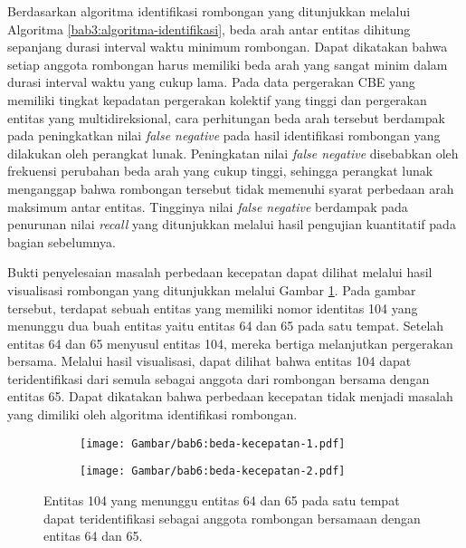 Berdasarkan algoritma identifikasi rombongan yang ditunjukkan melalui Algoritma \ref{bab3:algoritma-identifikasi}, beda arah antar entitas dihitung sepanjang durasi interval waktu minimum rombongan. Dapat dikatakan bahwa setiap anggota rombongan harus memiliki beda arah yang sangat minim dalam durasi interval waktu yang cukup lama. Pada data pergerakan CBE yang memiliki tingkat kepadatan pergerakan kolektif yang tinggi dan pergerakan entitas yang multidireksional, cara perhitungan beda arah tersebut berdampak pada peningkatkan nilai \textit{false negative} pada hasil identifikasi rombongan yang dilakukan oleh perangkat lunak. Peningkatan nilai \textit{false negative} disebabkan oleh frekuensi perubahan beda arah yang cukup tinggi, sehingga perangkat lunak menganggap bahwa rombongan tersebut tidak memenuhi syarat perbedaan arah maksimum antar entitas. Tingginya nilai \textit{false negative} berdampak pada penurunan nilai \textit{recall} yang ditunjukkan melalui hasil pengujian kuantitatif pada bagian sebelumnya.

Bukti penyelesaian masalah perbedaan kecepatan dapat dilihat melalui hasil visualisasi rombongan yang ditunjukkan melalui Gambar \ref{bab6:solusi-beda-kecepatan}. Pada gambar tersebut, terdapat sebuah entitas yang memiliki nomor identitas 104 yang menunggu dua buah entitas yaitu entitas 64 dan 65 pada satu tempat. Setelah entitas 64 dan 65 menyusul entitas 104, mereka bertiga melanjutkan pergerakan bersama. Melalui hasil visualisasi, dapat dilihat bahwa entitas 104 dapat teridentifikasi dari semula sebagai anggota dari rombongan bersama dengan entitas 65. Dapat dikatakan bahwa perbedaan kecepatan tidak menjadi masalah yang dimiliki oleh algoritma identifikasi rombongan.

\begin{figure}[t]
    \centering
    \captionsetup{width=.85\textwidth}
    \begin{subfigure}[t]{0.45\textwidth}
        \centering
        \texttt{[image: Gambar/bab6:beda-kecepatan-1.pdf]}
    \end{subfigure}
    \begin{subfigure}[t]{0.45\textwidth}
        \centering
        \texttt{[image: Gambar/bab6:beda-kecepatan-2.pdf]}
    \end{subfigure}
    \caption[Bukti penyelesaian beda kecepatan]{Entitas 104 yang menunggu entitas 64 dan 65 pada satu tempat dapat teridentifikasi sebagai anggota rombongan bersamaan dengan entitas 64 dan 65.}
    \label{bab6:solusi-beda-kecepatan}
\end{figure}

